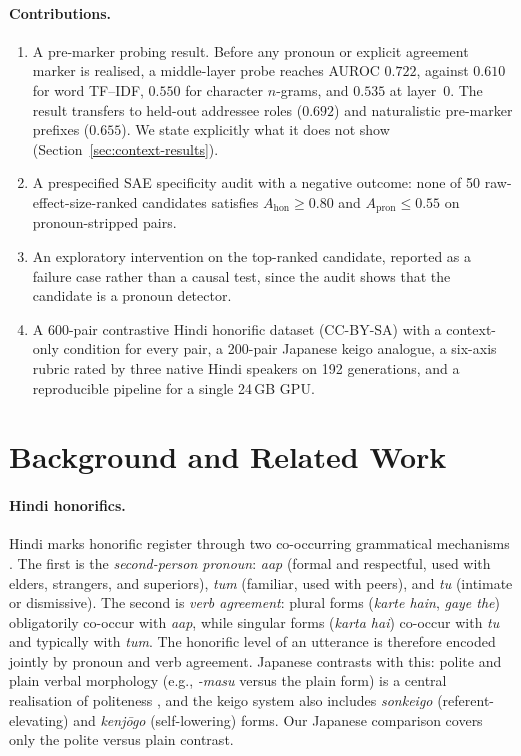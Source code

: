 \documentclass[11pt]{article}
\newcommand{\aap}{\textit{aap}}
\newcommand{\tum}{\textit{tum}}
\newcommand{\tu}{\textit{tu}}
\begin{document}
\paragraph{Contributions.}
\begin{enumerate}\itemsep0pt
  \item A pre-marker probing result. Before any pronoun or explicit agreement
        marker is realised, a middle-layer probe reaches AUROC $0.722$,
        against $0.610$ for word TF--IDF, $0.550$ for character $n$-grams, and
        $0.535$ at layer~0. The result transfers to held-out addressee roles
        ($0.692$) and naturalistic pre-marker prefixes ($0.655$). We state
        explicitly what it does not show (Section~\ref{sec:context-results}).
  \item A prespecified SAE specificity audit with a negative outcome: none of 50
        raw-effect-size-ranked candidates satisfies
        $A_{\mathrm{hon}}\geq0.80$ and $A_{\mathrm{pron}}\leq0.55$ on
        pronoun-stripped pairs.
  \item An exploratory intervention on the top-ranked candidate, reported as a
        failure case rather than a causal test, since the audit shows that the
        candidate is a pronoun detector.
  \item A 600-pair contrastive Hindi honorific dataset (CC-BY-SA) with a
        context-only condition for every pair, a 200-pair Japanese keigo
        analogue, a six-axis rubric rated by three native Hindi speakers on 192
        generations, and a reproducible pipeline for a single 24\,GB GPU.
\end{enumerate}

\section{Background and Related Work}
\label{sec:background}
\label{sec:related}

\paragraph{Hindi honorifics.}
Hindi marks honorific register through two co-occurring grammatical mechanisms
\citep{kachru2006hindi}. The first is the \emph{second-person pronoun}: \aap{}
(formal and respectful, used with elders, strangers, and superiors), \tum{}
(familiar, used with peers), and \tu{} (intimate or dismissive). The second is
\emph{verb agreement}: plural forms (\textit{karte hain}, \textit{gaye the})
obligatorily co-occur with \aap{}, while singular forms (\textit{karta hai})
co-occur with \tu{} and typically with \tum. The honorific level of an
utterance is therefore encoded jointly by pronoun and verb agreement.
Japanese contrasts with this: polite and plain verbal morphology (e.g.,
\textit{-masu} versus the plain form) is a central realisation of politeness
\citep{shibatani1990languages}, and the keigo system also includes
\textit{sonkeigo} (referent-elevating) and \textit{kenj\=ogo} (self-lowering)
forms. Our Japanese comparison covers only the polite versus plain contrast.
\end{document}
